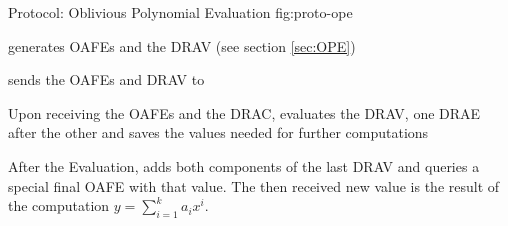 \begin{JWprotocol}%
  {\JWprotoSymOPE}%
  {Protocol: Oblivious Polynomial Evaluation}%
  {fig:proto-ope}


  \begin{JWprotoSteps}

  \item \JWpOne{} generates OAFEs and the DRAV (see section \ref{sec:OPE})

  \item \JWpOne{} sends the OAFEs and DRAV to \JWpTwo{}

  \end{JWprotoSteps}



  \begin{JWprotoSteps}

  \item Upon receiving the OAFEs and the DRAC, \JWpTwo{} evaluates the DRAV, one
    DRAE after the other and saves the values needed for further computations

  \item After the Evaluation, \JWpTwo{} adds both components of the last DRAV
    and queries a special final OAFE with that value. The then received new
    value is the result of the computation $y = \sum_{i=1}^k a_ix^i$.

  \end{JWprotoSteps}

\end{JWprotocol}
